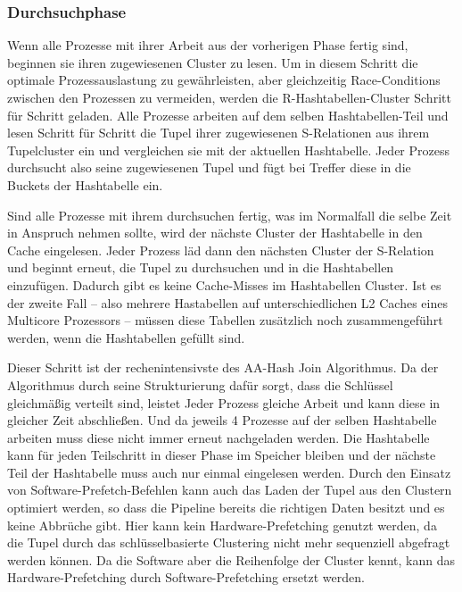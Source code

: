 \subsubsection*{Durchsuchphase}
\label{sec:AA_Hash-Join_Durchsuchphase}

Wenn alle Prozesse mit ihrer Arbeit aus der vorherigen Phase fertig sind, beginnen sie ihren zugewiesenen Cluster zu lesen. Um in diesem Schritt die optimale Prozessauslastung zu gewährleisten, aber gleichzeitig Race-Conditions zwischen den Prozessen zu vermeiden, werden die R-Hashtabellen-Cluster Schritt für Schritt geladen. Alle Prozesse arbeiten auf dem selben Hashtabellen-Teil und lesen Schritt für Schritt die Tupel ihrer zugewiesenen S-Relationen aus ihrem Tupelcluster ein und vergleichen sie mit der aktuellen Hashtabelle. Jeder Prozess durchsucht also seine zugewiesenen Tupel und fügt bei Treffer diese in die Buckets der Hashtabelle ein.

Sind alle Prozesse mit ihrem durchsuchen fertig, was im Normalfall die selbe Zeit in Anspruch nehmen sollte, wird der nächste Cluster der Hashtabelle in den Cache eingelesen. Jeder Prozess läd dann den nächsten Cluster der S-Relation und beginnt erneut, die Tupel zu durchsuchen und in die Hashtabellen einzufügen. Dadurch gibt es keine Cache-Misses im Hashtabellen Cluster. Ist es der zweite Fall – also mehrere Hastabellen auf unterschiedlichen L2 Caches eines Multicore Prozessors – müssen diese Tabellen zusätzlich noch zusammengeführt werden, wenn die Hashtabellen gefüllt sind.

Dieser Schritt ist der rechenintensivste des AA-Hash Join Algorithmus. Da der Algorithmus durch seine Strukturierung dafür sorgt, dass die Schlüssel gleichmäßig verteilt sind, leistet Jeder Prozess gleiche Arbeit und kann diese in gleicher Zeit abschließen. Und da jeweils 4 Prozesse auf der selben Hashtabelle arbeiten muss diese nicht immer erneut nachgeladen werden. Die Hashtabelle kann für jeden Teilschritt in dieser Phase im Speicher bleiben und der nächste Teil der Hashtabelle muss auch nur einmal eingelesen werden. Durch den Einsatz von Software-Prefetch-Befehlen kann auch das Laden der Tupel aus den Clustern optimiert werden, so dass die Pipeline bereits die richtigen Daten besitzt und es keine Abbrüche gibt. Hier kann kein Hardware-Prefetching genutzt werden, da die Tupel durch das schlüsselbasierte Clustering nicht mehr sequenziell abgefragt werden können. Da die Software aber die Reihenfolge der Cluster kennt, kann das Hardware-Prefetching durch Software-Prefetching ersetzt werden.

